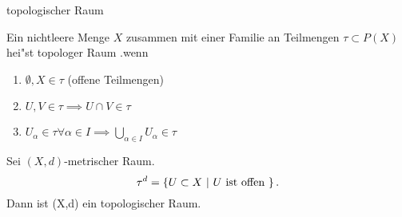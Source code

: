 \documentclass[class=article, crop=false]{standalone}
\begin{document}
\begin{zettel}{topologischer Raum}
\begin{flashcard}
    Ein nichtleere Menge $X$ zusammen mit einer Familie an Teilmengen $\tau \subset P(X)$  hei"st topologer Raum .wenn
    \begin{enumerate}
        \item $\emptyset, X \in  \tau $ (offene Teilmengen)
        \item $U,V \in  \tau  \implies U \cap V \in  \tau $ 
        \item $U_\alpha \in \tau \forall  \alpha \in I \implies \bigcup_{\alpha \in  I} U_{\alpha} \in  \tau  $ 
    \end{enumerate}
\end{flashcard}

\begin{example}
    Sei $ (X,d) $-metrischer Raum.
    \[
        \tau^d = \set{U \subset X}{U \text{ ist offen } }
    .\]
    Dann ist (X,d) ein topologischer Raum.
\end{example}


\end{zettel}
\end{document}
